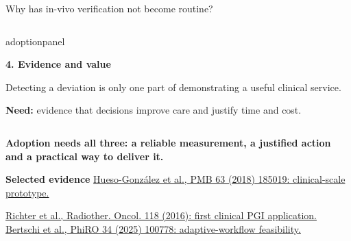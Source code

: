 \documentclass[aspectratio=169,11pt]{beamer}
\begin{document}
\begin{frame}{Why has in-vivo verification not become routine?}
\begin{columns}[T,onlytextwidth]
\begin{beamercolorbox}[sep=6pt,wd=\linewidth]{adoptionpanel}
\begin{minipage}[t][1.65cm][t]{\linewidth}\raggedright
{\footnotesize\bfseries\color{crBlue}4. Evidence and value\par}
\vspace{0.07cm}
{\scriptsize
Detecting a deviation is only one part of demonstrating a useful clinical service.\par
\vspace{0.08cm}
\textbf{Need:} evidence that decisions improve care and justify time and cost.\par}
\end{minipage}
\end{beamercolorbox}
\end{columns}

\vspace{0.16cm}
{\footnotesize\bfseries\color{darkred}
Adoption needs all three: a reliable measurement, a justified action and a practical way to deliver it.\par}

\vfill
{\fontsize{6}{7}\selectfont\color{crGrey}\raggedright
\textbf{Selected evidence}\quad
\href{https://doi.org/10.1088/1361-6560/aad513}
{Hueso-Gonz\'alez et al., PMB 63 (2018) 185019: clinical-scale prototype.}\par
\href{https://doi.org/10.1016/j.radonc.2016.01.004}
{Richter et al., Radiother. Oncol. 118 (2016): first clinical PGI application.}\quad
\href{https://doi.org/10.1016/j.phro.2025.100778}
{Bertschi et al., PhiRO 34 (2025) 100778: adaptive-workflow feasibility.}\par
}
\end{frame}
\end{document}
